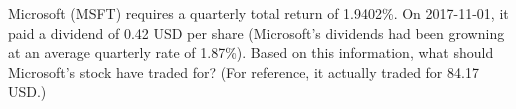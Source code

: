 Microsoft (MSFT) requires a quarterly total return of 1.9402\%. On 2017-11-01, it paid a dividend of 0.42 USD per share (Microsoft's dividends had been growning at an average quarterly rate of 1.87\%). Based on this information, what should Microsoft's stock have traded for? (For reference, it actually traded for 84.17 USD.)
